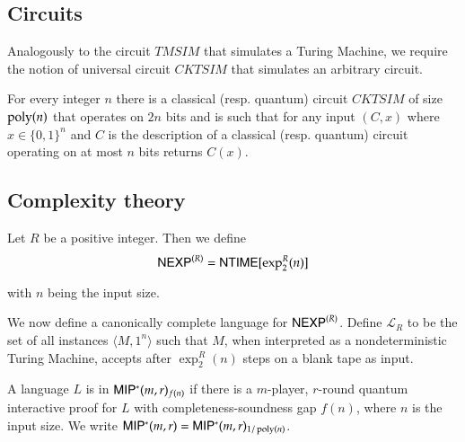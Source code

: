 \subsection{Circuits}

Analogously to the circuit $TMSIM$ that simulates a Turing Machine, we require the notion of universal circuit $CKTSIM$ that simulates an arbitrary circuit. 

\begin{lemma}\label{lem:cktsim}
For every integer $n$ there is a classical (resp. quantum) circuit $CKTSIM$ of size $\operatorname{poly}(n)$ that operates on $2n$ bits and is such that for any input $(C,x)$ where $x\in\{0,1\}^n$ and $C$ is the description of a classical (resp. quantum) circuit operating on at most $n$ bits returns $C(x)$. 
\end{lemma}

\subsection{Complexity theory}

\begin{definition}
	Let $R$ be a positive integer. Then we define
	\[
		{\sf NEXP}^{(R)} = {\sf NTIME}[\exp^R_2(n)]
	\]
\end{definition}
with $n$ being the input size. 

We now define a canonically complete language for ${\sf NEXP}^{(R)}$. Define $\mathcal{L}_R$ to be the set of all instances $\langle M, 1^n \rangle$ such that $M$, when interpreted as a nondeterministic Turing Machine, accepts after $\exp^R_2(n)$ steps on a blank tape as input.

\begin{definition}[$\MIPstar$]
	A language $L$ is in ${\sf MIP^*}(m,r)_{f(n)}$ if there is a $m$-player, $r$-round quantum interactive proof for $L$ with completeness-soundness gap $f(n)$, where $n$ is the input size. We write ${\sf MIP^*}(m,r) = {\sf MIP^*}(m,r)_{1/\operatorname{poly}(n)}$.
\end{definition}


